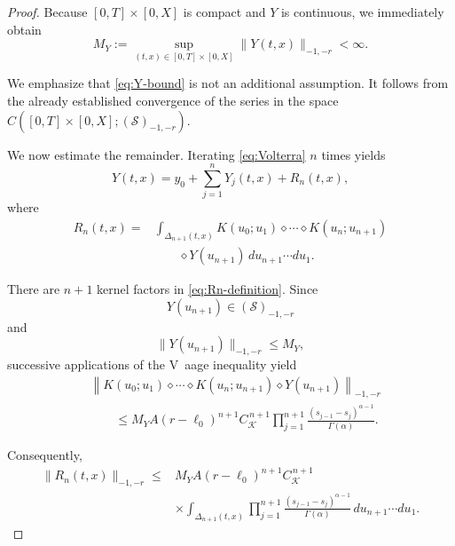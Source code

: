 \documentclass[10pt,a4paper]{amsart}
\begin{document}
\begin{proof}
Because $[0,T]\times[0,X]$ is compact and $Y$ is continuous,
we immediately obtain
\begin{equation}
\boxed{
M_Y:=
\sup_{(t,x)\in[0,T]\times[0,X]}
\|Y(t,x)\|_{-1,-r}
<\infty.
}
\label{eq:Y-bound}
\end{equation}

We emphasize that \eqref{eq:Y-bound} is not an additional assumption.
It follows from the already established convergence of the series in
the space
$C([0,T]\times[0,X];(\mathcal S)_{-1,-r})$.

We now estimate the remainder. Iterating \eqref{eq:Volterra} $n$
times yields
\begin{equation}
Y(t,x)
=
y_0+\sum_{j=1}^{n}Y_j(t,x)+R_n(t,x),
\label{eq:remainder-decomposition}
\end{equation}
where
\begin{equation}
\begin{aligned}
R_n(t,x)
={}&
\int_{\Delta_{n+1}(t,x)}
K(u_0;u_1)\diamond\cdots\diamond
K(u_n;u_{n+1})
\\
&\qquad\diamond
Y(u_{n+1})
\,du_{n+1}\cdots du_1.
\end{aligned}
\label{eq:Rn-definition}
\end{equation}

There are $n+1$ kernel factors in \eqref{eq:Rn-definition}.
Since
\[
Y(u_{n+1})\in(\mathcal S)_{-1,-r}
\]
and
\[
\|Y(u_{n+1})\|_{-1,-r}\leq M_Y,
\]
successive applications of the V\ aage inequality yield
\begin{equation}
\begin{aligned}
&
\left\|
K(u_0;u_1)\diamond\cdots\diamond
K(u_n;u_{n+1})
\diamond Y(u_{n+1})
\right\|_{-1,-r}
\\
&\qquad\leq
M_Y
A(r-\ell_0)^{n+1}
C_{\mathcal K}^{\,n+1}
\prod_{j=1}^{n+1}
\frac{(s_{j-1}-s_j)^{\alpha-1}}
{\Gamma(\alpha)}.
\end{aligned}
\label{eq:Rn-integrand-bound}
\end{equation}

Consequently,
\begin{equation}
\begin{aligned}
\|R_n(t,x)\|_{-1,-r}
\leq{}&
M_Y
A(r-\ell_0)^{n+1}
C_{\mathcal K}^{\,n+1}
\\
&\times
\int_{\Delta_{n+1}(t,x)}
\prod_{j=1}^{n+1}
\frac{(s_{j-1}-s_j)^{\alpha-1}}
{\Gamma(\alpha)}
\,du_{n+1}\cdots du_1.
\end{aligned}
\label{eq:Rn-bound1}
\end{equation}


\end{proof}
\end{document}

